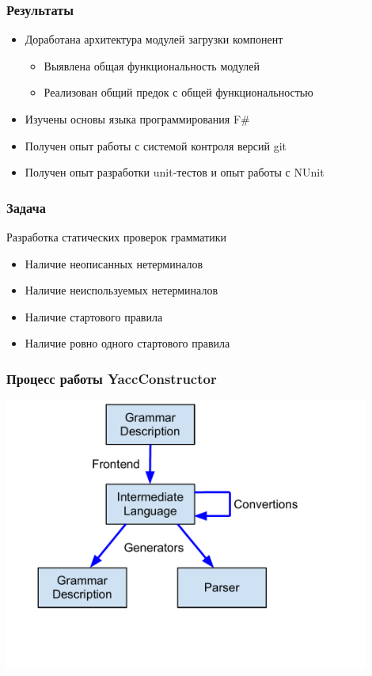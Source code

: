 \documentclass{beamer}
\begin{document}
\begin{frame}
	\transwipe[direction=90]
	\frametitle{Результаты}
	\begin{itemize}
        \item Доработана архитектура модулей загрузки компонент
	    \begin{itemize}
            \item Выявлена общая функциональность модулей
            \item Реализован общий предок с общей функциональностью
        \end{itemize}
        \item Изучены основы языка программирования F\#
        \item Получен опыт работы с системой контроля версий git
        \item Получен опыт разработки unit-тестов и опыт работы с NUnit
    \end{itemize}    
\end{frame}    

\author[Шенбин Илья]{}

\begin{frame}
	\transwipe[direction=90]
	\frametitle{Задача}
	Разработка статических проверок грамматики
	\begin{itemize}
        \item Наличие неописанных нетерминалов
        \item Наличие неиспользуемых нетерминалов
        \item Наличие стартового правила
        \item Наличие ровно одного стартового правила
    \end{itemize}
\end{frame}    

\begin{frame}
	\transwipe[direction=90]
	\frametitle{Процесс работы YaccConstructor}
	\begin{center}
        {\includegraphics[width= 0.9\textwidth, height=\textheight]{diagrams/YC_workflow_base.pdf}}
    \end{center}
\end{frame}
\end{document}
